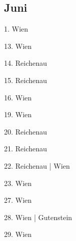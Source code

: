 \documentclass[twoside=false,titlepage=false,open=any, parskip=never, fontsize=10pt, headings=small, chapterprefix=false, appendixprefix=false, DIV=15]{scrbook}
\begin{document}
\begin{multicols}{3}
            \section*{Juni}
            1. Wien\par
            13. Wien\par
            14. Reichenau\par
            15. Reichenau\par
            16. Wien\par
            19. Wien\par
            20. Reichenau\par
            21. Reichenau\par
            22. Reichenau | Wien\par
            23. Wien\par
            27. Wien\par
            28. Wien | Gutenstein\par
            29. Wien\par

\end{multicols}
\end{document}

